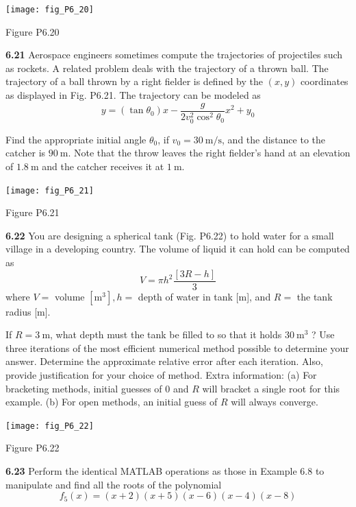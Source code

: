 \documentclass[../main.tex]{subfiles}
\begin{document}
\begin{multicols}{2}
    \begin{center}
        \texttt{[image: fig\_P6\_20]}
    
        \textsf{Figure P6.20}
    \end{center}

    \noindent\textbf{6.21} Aerospace engineers sometimes compute the trajectories of projectiles such as rockets. A related problem deals with the trajectory of a thrown ball. The trajectory of a ball thrown by a right fielder is defined by the $(x, y)$ coordinates as displayed in Fig. P6.21. The trajectory can be modeled as
    $$
    y=\left(\tan \theta_{0}\right) x-\frac{g}{2 v_{0}^{2} \cos ^{2} \theta_{0}} x^{2}+y_{0}
    $$

    Find the appropriate initial angle $\theta_{0}$, if $v_{0}=30 \mathrm{~m} / \mathrm{s}$, and the distance to the catcher is $90 \mathrm{~m}$. Note that the throw leaves the right fielder's hand at an elevation of $1.8 \mathrm{~m}$ and the catcher receives it at $1 \mathrm{~m}$.
    
    \begin{center}
        \texttt{[image: fig\_P6\_21]}
    
        \textsf{Figure P6.21}
    \end{center}

    \noindent\textbf{6.22} You are designing a spherical tank (Fig. P6.22) to hold water for a small village in a developing country. The volume of liquid it can hold can be computed as
    $$
    V=\pi h^{2} \frac{[3 R-h]}{3}
    $$
    where $V=$ volume $\left[\mathrm{m}^{3}\right], h=$ depth of water in tank [m], and $R=$ the tank radius [m].

    If $R=3 \mathrm{~m}$, what depth must the tank be filled to so that it holds $30 \mathrm{~m}^{3}$ ? Use three iterations of the most efficient numerical method possible to determine your answer. Determine the approximate relative error after each iteration. Also, provide justification for your choice of method. Extra information: (a) For bracketing methods, initial guesses of 0 and $R$ will bracket a single root for this example. (b) For open methods, an initial guess of $R$ will always converge. 
    
    \begin{center}
        \texttt{[image: fig\_P6\_22]}
    
        \textsf{Figure P6.22}
    \end{center}

    \noindent\textbf{6.23} Perform the identical MATLAB operations as those in Example $6.8$ to manipulate and find all the roots of the polynomial
    $$
    f_{5}(x)=(x+2)(x+5)(x-6)(x-4)(x-8)
    $$


\end{multicols}
\end{document}
